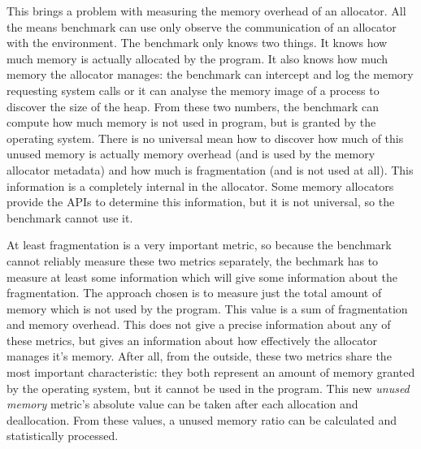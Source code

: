 This brings a problem with measuring the memory overhead of an allocator. All the
means benchmark can use only observe the communication of an allocator with the
environment. The benchmark only knows two things. It knows how much memory is
actually allocated by the program. It also knows how much memory the allocator
manages: the benchmark can intercept and log the memory requesting system calls
or it can analyse the memory image of a process to discover the size of the heap.
From these two numbers, the benchmark can compute how much memory is not used in
 program, but is granted by the operating system. There is no universal mean how
to discover how much of this unused memory is actually memory overhead (and is
used by the memory allocator metadata) and how much is fragmentation (and is not
used at all). This information is a completely internal in the allocator. Some
memory allocators provide the APIs to determine this information, but it is not
universal, so the benchmark cannot use it.

At least fragmentation is a very important metric, so because the benchmark
cannot reliably measure these two metrics separately, the bechmark has to measure
at least some information which will give some information about the
fragmentation. The approach chosen is to measure just the total amount of memory
which is not used by the program. This value is a sum of fragmentation and memory
overhead. This does not give a precise information about any of these metrics,
but gives an information about how effectively the allocator manages it's memory.
After all, from the outside, these two metrics share the most important
characteristic: they both represent an amount of memory granted by the operating
system, but it cannot be used in the program. This new {\em unused memory}
metric's absolute value can be taken after each allocation and deallocation. From
these values, a unused memory ratio can be calculated and statistically
processed.

